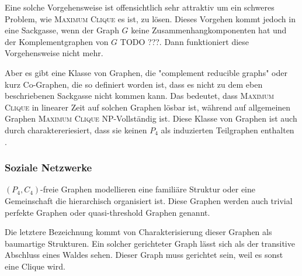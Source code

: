 \documentclass[12pt,a4paper,onecolumn,oneside,titlepage]{article}
\begin{document}
Eine solche Vorgehensweise ist offensichtlich sehr attraktiv um ein schweres Problem, wie \textsc{Maximum Clique} es ist, zu lösen. Dieses Vorgehen kommt jedoch in eine Sackgasse, wenn der Graph $G$ keine Zusammenhangkomponenten hat und der Komplementgraphen von $G$ TODO ???.
Dann funktioniert diese Vorgehensweise nicht mehr. 

Aber es gibt eine Klasse von Graphen, die "complement reducible graphs" oder kurz Co-Graphen, die so definiert worden ist, dass es nicht zu dem eben beschriebenen Sackgasse nicht kommen kann.
Das bedeutet, dass \textsc{Maximum Clique} in linearer Zeit auf solchen Graphen lösbar ist, während auf allgemeinen Graphen \textsc{Maximum Clique} NP-Vollständig ist.
Diese Klasse von Graphen ist auch durch charaktereriesiert, dass sie keinen $P_4$ als induzierten Teilgraphen enthalten \cite{NastosG13}.

\subsubsection{Soziale Netzwerke}
$(P_4,C_4)$-freie Graphen modellieren eine familiäre Struktur oder eine Gemeinschaft die hierarchisch organisiert ist. Diese Graphen werden auch trivial perfekte Graphen oder quasi-threshold Graphen genannt\cite{Wolk65}. 

Die letztere Bezeichnung kommt von Charakterisierung dieser Graphen als baumartige Strukturen. Ein solcher gerichteter Graph lässt sich als der transitive Abschluss eines Waldes sehen\cite{BrandesHSW15}. Dieser Graph muss gerichtet sein, weil es sonst eine Clique wird.
\end{document}
